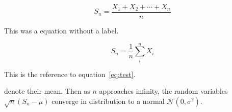 $$S_n = \frac{X_1 + X_2 + \cdots + X_n}{n}$$

This was a equation without a label.
      
\begin{equation}
S_n = \frac{1}{n}\sum_{i}^{n} X_i
\label{eq:test}
\end{equation}


This is the reference to equation~\ref{eq:test}.      


denote their mean. Then as $n$ approaches infinity, the random variables $\sqrt{n}(S_n - \mu)$ converge in distribution to a normal $\mathcal{N}(0, \sigma^2)$.


